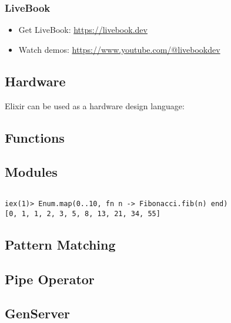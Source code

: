 {\subsubsection{LiveBook}

\begin{itemize}
  \item Get LiveBook: \url{https://livebook.dev}
  \item Watch demos: \url{https://www.youtube.com/@livebookdev}
\end{itemize}

\subsection{Hardware}

Elixir can be used as a hardware design language: \\

\subsection{Functions}

\subsection{Modules}

\inputminted[fontsize=\normalsize]{elixir}{../src/elixir/fibonacci.ex}

\begin{verbatim}
iex(1)> Enum.map(0..10, fn n -> Fibonacci.fib(n) end)
[0, 1, 1, 2, 3, 5, 8, 13, 21, 34, 55]
\end{verbatim}

\subsection{Pattern Matching}

\subsection{Pipe Operator}

\subsection{GenServer}

}
